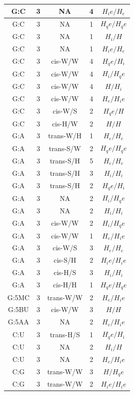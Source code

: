 \begin{center}
\begin{longtable}{c|c|c|c|c}
G:C & 3 & NA & 4 & $H_ie/H_e$ \\  \hline
G:C & 3 & NA & 1 & $H_qe/H_qe$ \\  \hline
G:C & 3 & NA & 1 & $H_i/H$ \\  \hline
G:C & 3 & NA & 1 & $H_ie/H_e$ \\  \hline
G:C & 3 & cis-W/W & 4 & $H_qe/H_i$ \\  \hline
G:C & 3 & cis-W/W & 4 & $H_i/H_qe$ \\  \hline
G:C & 3 & cis-W/W & 4 & $H/H_i$ \\  \hline
G:C & 3 & cis-W/W & 4 & $H_e/H_ie$ \\  \hline
G:C & 3 & cis-W/S & 2 & $H_qe/H$ \\  \hline
G:C & 3 & cis-H/W & 2 & $H/H$ \\  \hline
G:A & 3 & trans-W/H & 1 & $H_e/H_e$ \\  \hline
G:A & 3 & trans-S/W & 2 & $H_qe/H_qe$ \\  \hline
G:A & 3 & trans-S/H & 5 & $H_e/H_e$ \\  \hline
G:A & 3 & trans-S/H & 3 & $H_i/H_i$ \\  \hline
G:A & 3 & trans-S/H & 2 & $H_qe/H_i$ \\  \hline
G:A & 3 & NA & 2 & $H_i/H_qe$ \\  \hline
G:A & 3 & NA & 2 & $H_i/H_i$ \\  \hline
G:A & 3 & cis-W/W & 2 & $H_i/H_qe$ \\  \hline
G:A & 3 & cis-W/W & 1 & $H_e/H_ie$ \\  \hline
G:A & 3 & cis-W/S & 3 & $H_e/H_e$ \\  \hline
G:A & 3 & cis-S/H & 2 & $H_ie/H_ie$ \\  \hline
G:A & 3 & cis-H/S & 3 & $H_i/H_i$ \\  \hline
G:A & 3 & cis-H/H & 1 & $H_qe/H_qe$ \\  \hline
G:5MC & 3 & trans-W/W & 2 & $H_e/H_ie$ \\  \hline
G:5BU & 3 & cis-W/W & 3 & $H/H$ \\  \hline
G:5AA & 3 & NA & 2 & $H_e/H_ie$ \\  \hline
C:U & 3 & trans-H/S & 1 & $H_qe/H_i$ \\  \hline
C:U & 3 & NA & 2 & $H_i/H$ \\  \hline
C:U & 3 & NA & 2 & $H_e/H_ie$ \\  \hline
C:G & 3 & trans-W/W & 3 & $H/H_qe$ \\  \hline
C:G & 3 & trans-W/W & 2 & $H_ie/H_ie$ \\  \hline

\end{longtable}
\end{center}
